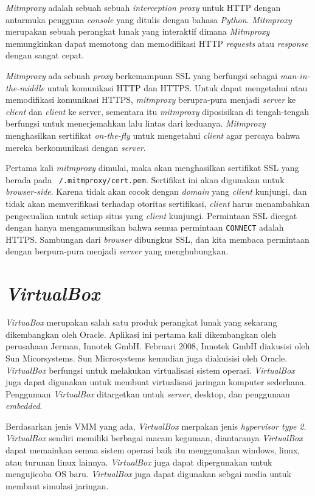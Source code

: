 	\textit{Mitmproxy} adalah sebuah sebuah \textit{interception proxy} untuk HTTP dengan antarmuka pengguna \textit{console} yang ditulis dengan bahasa \textit{Python}. \textit{Mitmproxy} merupakan sebuah perangkat lunak yang interaktif dimana \textit{Mitmproxy} memungkinkan dapat memotong dan memodifikasi HTTP \textit{requests} atau \textit{response} dengan sangat cepat.
	
	\textit{Mitmproxy} ada sebuah \textit{proxy} berkemampuan SSL yang berfungsi sebagai \textit{man-in-the-middle} untuk komunikasi HTTP dan HTTPS. Untuk dapat mengetahui atau memodifikasi komunikasi HTTPS, \textit{mitmproxy} berupra-pura menjadi \textit{server} ke \textit{client} dan \textit{client} ke server, sementara itu \textit{mitmproxy} diposisikan di tengah-tengah berfungsi untuk menerjemahkan lalu lintas dari keduanya. \textit{Mitmproxy} menghasilkan sertifikat \textit{on-the-fly} untuk mengetahui \textit{client} agar percaya bahwa mereka berkomunikasi dengan \textit{server}.
	
	Pertama kali \textit{mitmproxy} dimulai, maka akan menghasilkan sertifikat SSL yang berada pada \texttt{~/.mitmproxy/cert.pem}. Sertifikat ini akan digunakan untuk \textit{browser-side}. Karena tidak akan cocok dengan \textit{domain} yang \textit{client} kunjungi, dan tidak akan memverifikasi terhadap otoritas sertifikasi, \textit{client} harus menambahkan pengecualian untuk setiap situs yang \textit{client} kunjungi. Permintaan SSL dicegat dengan hanya mengamsumsikan bahwa semua permintaan \texttt{CONNECT} adalah HTTPS. Sambungan dari \textit{browser} dibungkus SSL, dan kita membaca permintaan dengan berpura-pura menjadi \textit{server} yang menghubungkan.
	
	\section{\textit{VirtualBox}}
	\textit{VirtuaBox} merupakan salah satu produk perangkat lunak yang sekarang dikembangkan oleh Oracle. Aplikasi ini pertama kali dikembangkan oleh perusahaan Jerman, Innotek GmbH. Februari 2008, Innotek GmbH diakusisi oleh Sun Micorsystems. Sun Microsystems kemudian juga diakuisisi oleh Oracle. \textit{VirtualBox} berfungsi untuk melakukan virtualisasi sistem operasi. \textit{VirtualBox} juga dapat digunakan untuk membuat virtualisasi jaringan komputer sederhana. Penggunaan \textit{VirtualBox} ditargetkan untuk \textit{server}, desktop, dan penggunaan \textit{embedded}.
	
	Berdasarkan jenis VMM yang ada, \textit{VirtualBox} merpakan jenis \textit{hypervisor type 2}. \textit{VirtualBox} sendiri memiliki berbagai macam kegunaan, diantaranya \textit{VirtualBox} dapat memainkan semua sistem  operasi baik itu menggunakan windows, linux, atau turunan linux lainnya. \textit{VirtualBox} juga dapat dipergunakan untuk mengujicoba OS baru. \textit{VirtualBox} juga dapat digunakan sebgai media untuk membaut simulasi jaringan.
	
